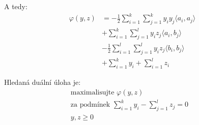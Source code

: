 \begin{multicols}{2}
    A tedy:
    \begin{align}
        \varphi(y, z) &= -\frac{1}{2}\sum_{i=1}^{k}\sum_{j=1}^{k}y_i y_j \langle a_i, a_j\rangle \\
        &+ \sum_{i=1}^{k}\sum_{j=1}^{l}y_i z_j \langle a_i, b_j\rangle \\
        &- \frac{1}{2}\sum_{i=1}^{l}\sum_{j=1}^{l}y_i z_j \langle b_i, b_j\rangle \\
        &+ \sum_{i=1}^{k}y_i + \sum_{i=1}^{l}z_i
    \end{align}
    
    Hledaná duální úloha je:
    \begin{align*}
        \text{maximalisujte } \varphi(y, z) \\
        \text{za podmínek } \sum_{i=1}^{k}y_i - \sum_{j=1}^{l}z_j = 0& \\
        y, z \geq 0& 
    \end{align*}
\end{multicols}


